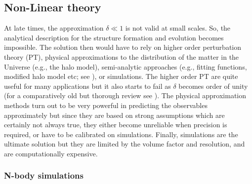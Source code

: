 \subsection{Non-Linear theory}

At late times, the approximation $\delta \ll 1$ is not valid at small scales. So, the analytical
description for the structure formation and evolution becomes impossible. The solution then would have to rely on higher order perturbation theory (PT), physical approximations to the
distribution of the matter in the Universe (e.g., the halo model), 
semi-analytic approaches (e.g., fitting functions, modified halo model etc;
see \cite{Takahashi:2012em,Smith:2002dz}), or simulations. 
The higher order PT are quite useful for many applications but it also starts to 
fail as $\delta$ becomes order of unity (for a comparatively old
but thorough review see \cite{1994FCPh...15..209D}). The physical approximation methods turn 
out to be very powerful in predicting the observables approximately 
but since they are based on strong assumptions which are 
certainly not always true, they either become unreliable when precision is required, or have
to be calibrated on simulations. Finally, simulations are the ultimate solution but they
are limited by the volume factor and resolution, and are computationally expensive. 


\subsubsection{N-body simulations}


